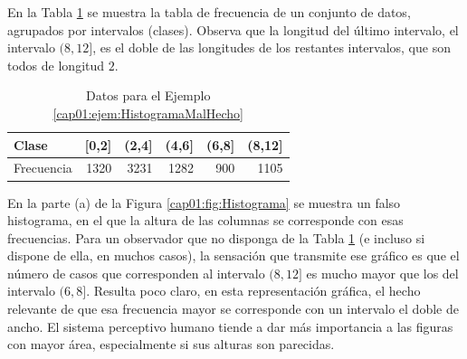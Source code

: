 \begin{ejemplo}
\label{cap01:ejem:HistogramaMalHecho}
En la Tabla \ref{cap01:tabla:EjemploHistogramaMalHecho} se muestra la tabla de frecuencia de un conjunto de datos, agrupados por intervalos (clases). Observa que la longitud del último intervalo, el intervalo $(8,12]$, es el doble de las longitudes de los restantes intervalos, que son todos de longitud $2$.

\begin{table}[ht]
\centering
\begin{tabular}{|l|rrrrr|}
  \hline
Clase & [0,2] & (2,4] & (4,6] & (6,8] & (8,12] \\
  \hline
Frecuencia & 1320 & 3231 & 1282 & 900 & 1105 \\
   \hline
\end{tabular}
\caption{Datos para el Ejemplo \ref{cap01:ejem:HistogramaMalHecho}}
\label{cap01:tabla:EjemploHistogramaMalHecho}
\end{table}

En la parte (a) de la Figura \ref{cap01:fig:Histograma} se muestra un falso histograma, en el que la altura de las columnas se corresponde con esas frecuencias. Para un observador que no disponga de la Tabla \ref{cap01:tabla:EjemploHistogramaMalHecho} (e incluso si dispone de ella, en muchos casos), la sensación que transmite ese gráfico es que el número de casos que corresponden al intervalo $(8,12]$ es mucho mayor que los del intervalo $(6,8]$. Resulta poco claro, en esta representación gráfica, el hecho relevante de que esa frecuencia mayor se corresponde con un intervalo el doble de ancho. El sistema perceptivo humano tiende a dar más importancia a las figuras con mayor área, especialmente si sus alturas son parecidas.


\end{ejemplo}
